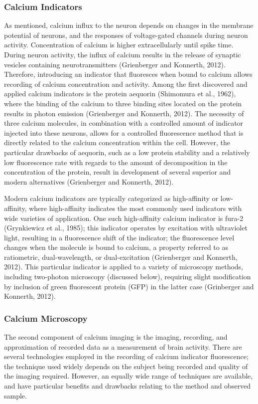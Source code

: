 \documentclass[11pt,titlepage]{article}
\begin{document}
\subsubsection{Calcium Indicators}
As mentioned, calcium influx to the neuron depends on changes in the membrane potential of neurons, and the responses of voltage-gated channels during neuron activity. Concentration of calcium is higher extracellularly until spike time. During neuron activity, the influx of calcium results in the release of synaptic vesicles containing neurotransmitters (Grienberger and Konnerth, 2012). Therefore, introducing an indicator that fluoresces when bound to calcium allows recording of calcium concentration and activity. Among the first discovered and applied calcium indicators is the protein aequorin (Shimomura et al., 1962), where the binding of the calcium to three binding sites located on the protein results in photon emission (Grienberger and Konnerth, 2012). The necessity of three calcium molecules, in combination with a controlled amount of indicator injected into these neurons, allows for a controlled fluorescence method that is directly related to the calcium concentration within the cell. However, the particular drawbacks of aequorin, such as a low protein stability and a relatively low fluorescence rate with regards to the amount of decomposition in the concentration of the protein, result in development of several superior and modern alternatives (Grienberger and Konnerth, 2012).\par

Modern calcium indicators are typically categorized as high-affinity or low-affinity, where high-affinity indicates the most commonly used indicators with wide varieties of application. One such high-affinity calcium indicator is fura-2 (Grynkiewicz et al., 1985); this indicator operates by excitation with ultraviolet light, resulting in a fluorescence shift of the indicator; the fluorescence level changes when the molecule is bound to calcium, a property referred to as ratiometric, dual-wavelength, or dual-excitation (Grienberger and Konnerth, 2012). This particular indicator is applied to a variety of microscopy methods, including two-photon microscopy (discussed below), requiring slight modification by inclusion of green fluorescent protein (GFP) in the latter case (Grinberger and Konnerth, 2012). 

\subsubsection{Calcium Microscopy}
The second component of calcium imaging is the imaging, recording, and approximation of recorded data as a measurement of brain activity. There are several technologies employed in the recording of calcium indicator fluorescence; the technique used widely depends on the subject being recorded and quality of the imaging required. However, an equally wide range of techniques are available, and have particular benefits and drawbacks relating to the method and observed sample.\par
\end{document}
